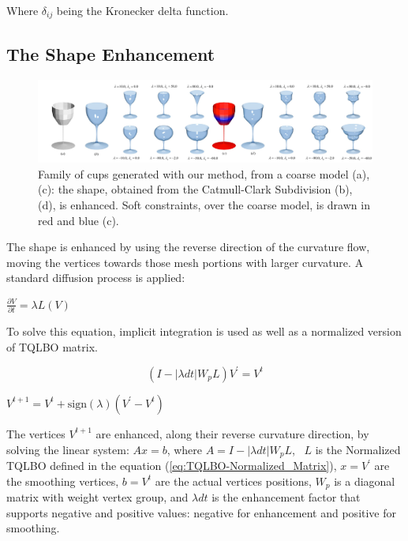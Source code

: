 \documentclass[10pt, conference]{IEEEtran}
\begin{document}
Where $\delta_{ij}$ being the Kronecker delta function.


\subsection{The Shape Enhancement\label{sub:Curvature-Enhancing}}

\begin{figure}[t]
\includegraphics[width=1\textwidth]{figs/teaser_cup}

\caption{\label{fig:Subdivision-Cups} Family of cups generated with our method,
from a coarse model (a), (c): the shape, obtained from the Catmull-Clark
Subdivision (b), (d), is enhanced. Soft constraints, over the coarse
model, is drawn in red and blue (c).}


\end{figure}


The shape is enhanced by using the reverse direction of the curvature
flow, moving the vertices towards those mesh portions with larger
curvature. A standard diffusion process is applied:

\begin{center}
$\frac{\partial V}{\partial t}=\lambda L\left(V\right)$ 
\par\end{center}

To solve this equation, implicit integration is used as well as a
normalized version of TQLBO matrix.

\begin{equation}
\left(I-\left|\lambda dt\right|W_{p}L\right)V^{\prime}=V^{t}\label{eq:Lineal_System_with_wp}
\end{equation}


\begin{center}
$V^{t+1}=V^{t}+\mbox{sign}\left(\lambda\right)\left(V^{\prime}-V^{t}\right)$
\par\end{center}

The vertices $V^{t+1}$ are enhanced, along their reverse curvature
direction, by solving the linear system: $Ax=b$, where $A=I-\left|\lambda dt\right|W_{p}L$,~
$L$ is the Normalized TQLBO defined in the equation (\ref{eq:TQLBO-Normalized_Matrix}),
$x=V^{\prime}$ are the smoothing vertices, $b=V^{t}$ are the actual
vertices positions, $W_{p}$ is a diagonal matrix with weight vertex
group, and $\lambda dt$ is the enhancement factor that supports negative
and positive values: negative for enhancement and positive for smoothing. 
\end{document}
